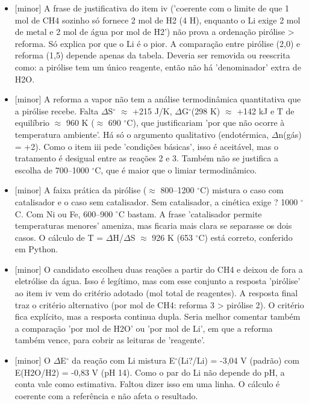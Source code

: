 \documentclass{article}%
\begin{document}
\begin{itemize}%
\item%
{[}minor{]} A frase de justificativa do item iv ('coerente com o limite de que 1 mol de CH4 sozinho só fornece 2 mol de H2 (4 H), enquanto o Li exige 2 mol de metal e 2 mol de água por mol de H2') não prova a ordenação pirólise > reforma. Só explica por que o Li é o pior. A comparação entre pirólise (2,0) e reforma (1,5) depende apenas da tabela. Deveria ser removida ou reescrita como: a pirólise tem um único reagente, então não há 'denominador' extra de H2O.%
\item%
{[}minor{]} A reforma a vapor não tem a análise termodinâmica quantitativa que a pirólise recebe. Falta $\Delta$S$^\circ$ $\approx$ +215 J/K, $\Delta$G$^\circ$(298 K) $\approx$ +142 kJ e T de equilíbrio $\approx$ 960 K ($\approx$ 690 $^\circ$C), que justificariam 'por que não ocorre à temperatura ambiente'. Há só o argumento qualitativo (endotérmica, $\Delta$n(gás) = +2). Como o item iii pede 'condições básicas', isso é aceitável, mas o tratamento é desigual entre as reações 2 e 3. Também não se justifica a escolha de 700--1000 $^\circ$C, que é maior que o limiar termodinâmico.%
\item%
{[}minor{]} A faixa prática da pirólise ($\approx$ 800--1200 $^\circ$C) mistura o caso com catalisador e o caso sem catalisador. Sem catalisador, a cinética exige ? 1000 $^\circ$C. Com Ni ou Fe, 600--900 $^\circ$C bastam. A frase 'catalisador permite temperaturas menores' ameniza, mas ficaria mais clara se separasse os dois casos. O cálculo de T = $\Delta$H/$\Delta$S $\approx$ 926 K (653 $^\circ$C) está correto, conferido em Python.%
\item%
{[}minor{]} O candidato escolheu duas reações a partir do CH4 e deixou de fora a eletrólise da água. Isso é legítimo, mas com esse conjunto a resposta 'pirólise' ao item iv vem do critério adotado (mol total de reagentes). A resposta final traz o critério alternativo (por mol de CH4: reforma 3 > pirólise 2). O critério fica explícito, mas a resposta continua dupla. Seria melhor comentar também a comparação 'por mol de H2O' ou 'por mol de Li', em que a reforma também vence, para cobrir as leituras de 'reagente'.%
\item%
{[}minor{]} O $\Delta$E$^\circ$ da reação com Li mistura E$^\circ$(Li?/Li) = -3,04 V (padrão) com E(H2O/H2) = -0,83 V (pH 14). Como o par do Li não depende do pH, a conta vale como estimativa. Faltou dizer isso em uma linha. O cálculo é coerente com a referência e não afeta o resultado.%
\end{itemize}%
\end{document}
